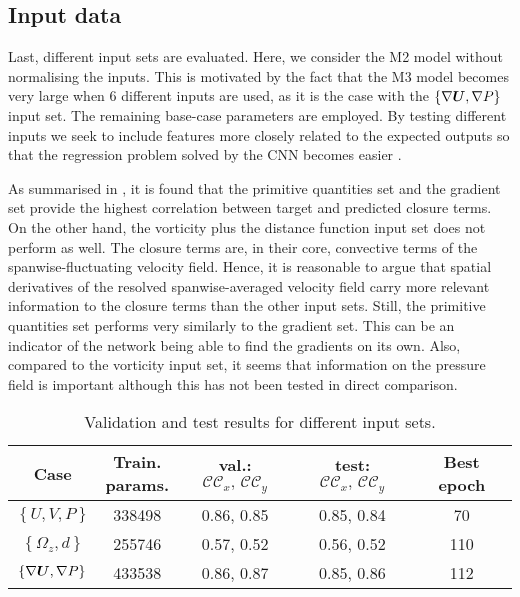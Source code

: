 \documentclass[../main.tex]{subfiles}
\begin{document}
\subsection{Input data}

Last, different input sets are evaluated.
Here, we consider the M2 model without normalising the inputs.
This is motivated by the fact that the M3 model becomes very large when 6 different inputs are used, as it is the case with the $\left\lbrace \nabla\boldsymbol{U}, \nabla P \right\rbrace$ input set.
The remaining base-case parameters are employed.
By testing different inputs we seek to include features more closely related to the expected outputs so that the regression problem solved by the CNN becomes easier \citep{Gamahara2017, Beck2019}.

As summarised in , it is found that the primitive quantities set and the gradient set provide the highest correlation between target and predicted closure terms.
On the other hand, the vorticity plus the distance function input set does not perform as well.
The closure terms are, in their core, convective terms of the spanwise-fluctuating velocity field.
Hence, it is reasonable to argue that spatial derivatives of the resolved spanwise-averaged velocity field carry more relevant information to the closure terms than the other input sets.
Still, the primitive quantities set performs very similarly to the gradient set.
This can be an indicator of the network being able to find the gradients on its own.
Also, compared to the vorticity input set, it seems that information on the pressure field is important although this has not been tested in direct comparison.

{\renewcommand{\arraystretch}{1.2}
\begin{table}
\begin{center}
\begin{tabular}{ccccc}
\toprule
Case & \specialcell{Train.\\params.} & val.: $\mathcal{CC}_x,\,\mathcal{CC}_y$ & test: $\mathcal{CC}_x,\,\mathcal{CC}_y$ & Best epoch\\
\midrule
$\left\lbrace U, V, P \right\rbrace$& 338498 & 0.86, 0.85 & 0.85, 0.84 & 70\\
$\left\lbrace \Omega_z, d \right\rbrace$& 255746 & 0.57, 0.52  & 0.56, 0.52 & 110\\
$\left\lbrace \nabla\boldsymbol{U}, \nabla P \right\rbrace$ & 433538 & 0.86, 0.87 & 0.85, 0.86 & 112\\
\bottomrule
\end{tabular}
\end{center}
\caption{Validation and test results for different input sets.}
\label{tab:inputs_correlation}
\end{table}}
\end{document}
